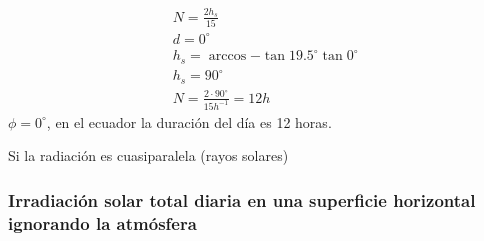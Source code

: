 \begin{itemize}
    \begin{align}
        &N = \frac{2h_s}{15}\\
        &d = 0^{\circ}\\
        &h_s = \arccos{ -\tan{19.5^{\circ}} \tan{0^{\circ}}}\\
        &h_s = 90^{\circ}\\
        &N = \frac{2 \cdot 90^{\circ}}{15h^{ - 1}} = 12 h 
    \end{align}
    $\phi = 0^{\circ}$, en el ecuador la duración del día es 12 horas.
\end{itemize}
Si la radiación es cuasiparalela (rayos solares)

\subsubsection{Irradiación solar total diaria en una superficie horizontal ignorando la atmósfera}

